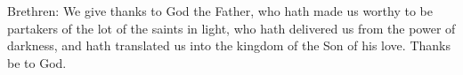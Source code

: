\noindent Brethren: We give thanks to God the Father, who hath made us worthy to be partakers of the lot of the saints in light, who hath delivered us from the power of darkness, and hath translated us into the kingdom of the Son of his love. \rr Thanks be to God.